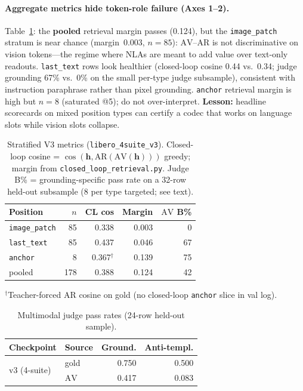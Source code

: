 \documentclass[10pt]{article}
\newcommand{\AV}{\ensuremath{\mathrm{AV}}}
\newcommand{\AR}{\ensuremath{\mathrm{AR}}}
\newcommand{\hvec}{\mathbf{h}}
\newcommand{\code}[1]{\texttt{\small #1}}
\begin{document}
\paragraph{Aggregate metrics hide token-role failure (Axes 1--2).}
Table~\ref{tab:stratified}: the \textbf{pooled} retrieval margin passes
(0.124), but the \code{image\_patch} stratum is near chance
(margin~0.003, \(n{=}85\)): \(\AV\)--\(\AR\) is not discriminative on
vision tokens---the regime where NLAs are meant to add value over text-only
readouts.
\code{last\_text} rows look healthier (closed-loop cosine 0.44 vs.\ 0.34;
judge grounding 67\% vs.\ 0\% on the small per-type judge subsample),
consistent with instruction paraphrase rather than pixel grounding.
\code{anchor} retrieval margin is high but \(n{=}8\) (saturated @5);
do not over-interpret.
\textbf{Lesson:} headline scorecards on mixed position types can certify a
codec that works on language slots while vision slots collapse.

\begin{table}[t]
  \centering
  \caption{Stratified V3 metrics (\code{libero\_4suite\_v3}). Closed-loop
  cosine = \(\cos(\hvec,\AR(\AV(\hvec)))\) greedy; margin from
  \code{closed\_loop\_retrieval.py}. Judge B\% = grounding-specific pass
  rate on a 32-row held-out subsample (8 per type targeted; see text).}
  \label{tab:stratified}
  \small
  \begin{tabular}{@{}lrrrr@{}}
    \toprule
    Position & \(n\) & CL cos & Margin & \(\AV\) B\% \\
    \midrule
    \code{image\_patch} & 85 & 0.338 & 0.003 & 0 \\
    \code{last\_text}   & 85 & 0.437 & 0.046 & 67 \\
    \code{anchor}       &  8 & 0.367$^\dagger$ & 0.139 & 75 \\
    \midrule
    pooled              & 178 & 0.388 & 0.124 & 42 \\
    \bottomrule
  \end{tabular}
  \vspace{0.25em}
  {\footnotesize $^\dagger$Teacher-forced AR cosine on gold (no closed-loop
  \code{anchor} slice in val log).}
\end{table}

\begin{table}[t]
  \centering
  \caption{Multimodal judge pass rates (24-row held-out sample).}
  \label{tab:judge}
  \small
  \begin{tabular}{@{}llrr@{}}
    \toprule
    Checkpoint & Source & Ground. & Anti-templ. \\
    \midrule
    \multirow{2}{*}{v3 (4-suite)}
      & gold & 0.750 & 0.500 \\
      & \(\AV\) & 0.417 & 0.083 \\
    \bottomrule
  \end{tabular}
\end{table}
\end{document}
